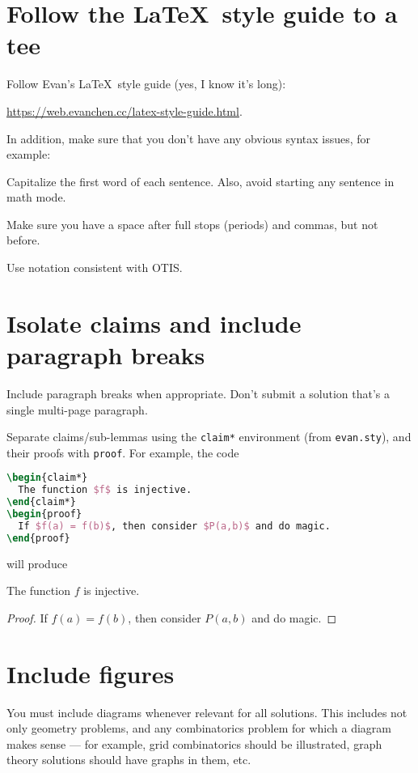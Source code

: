 \documentclass[11pt]{scrartcl}
\begin{document}
\section{Follow the \LaTeX\ style guide to a tee}
Follow Evan's \LaTeX\ style guide (yes, I know it's long):
\begin{center}
  \Large
  \url{https://web.evanchen.cc/latex-style-guide.html}.
\end{center}
In addition, make sure that you don't have any obvious syntax issues, for example:
\begin{itemize}
\ii Capitalize the first word of each sentence.
Also, avoid starting any sentence in math mode.

\ii Make sure you have a space after full stops (periods) and commas, but not before.

\ii Use notation consistent with OTIS.
\end{itemize}

\section{Isolate claims and include paragraph breaks}
\alert{Include paragraph breaks when appropriate}.
Don't submit a solution that's a single multi-page paragraph.

Separate claims/sub-lemmas using the \texttt{claim*} environment
(from \texttt{evan.sty}), and their proofs with \texttt{proof}.
For example, the code
\begin{lstlisting}[language=TeX]
\begin{claim*}
  The function $f$ is injective.
\end{claim*}
\begin{proof}
  If $f(a) = f(b)$, then consider $P(a,b)$ and do magic.
\end{proof}
\end{lstlisting}
will produce
\begin{claim*}
  The function $f$ is injective.
\end{claim*}
\begin{proof}
  If $f(a) = f(b)$, then consider $P(a,b)$ and do magic.
\end{proof}

\section{Include figures}
You must \alert{include diagrams whenever relevant}
for all solutions. This includes not only geometry problems,
and any combinatorics problem for which a diagram makes sense ---
for example, grid combinatorics should be illustrated,
graph theory solutions should have graphs in them, etc.
\end{document}
